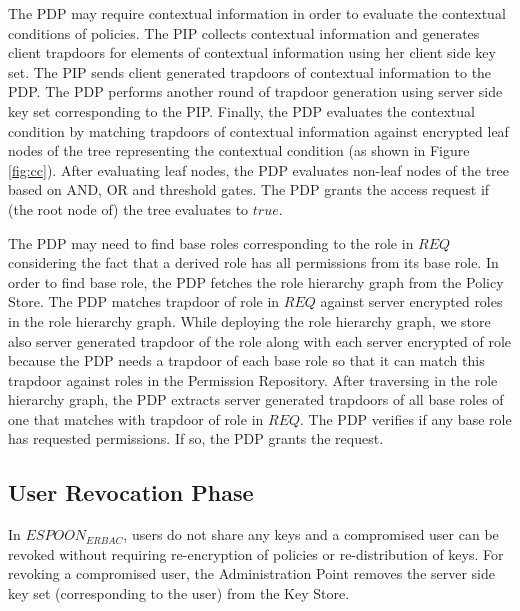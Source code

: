\documentclass[final,5p,times,twocolumn]{elsarticle}
\begin{document}
The PDP may require contextual information in order to evaluate the contextual conditions of policies. The PIP collects contextual information and generates client trapdoors for elements of contextual information using her client side key set. The PIP sends client generated trapdoors of contextual information to the PDP. The PDP performs another round of trapdoor generation using server side key set corresponding to the PIP. Finally, the PDP evaluates the contextual condition by matching trapdoors of contextual information against encrypted leaf nodes of the tree representing the contextual condition (as shown in Figure \ref{fig:cc}). After evaluating leaf nodes, the PDP evaluates non-leaf nodes of the tree based on AND, OR and threshold gates. The PDP grants the access request if (the root node of) the tree evaluates to $\mathit{true}$.

The PDP may need to find base roles corresponding to the role in $\mathit{REQ}$ considering the fact that a derived role has all permissions from its base role. In order to find base role, the PDP fetches the role hierarchy graph from the Policy Store. The PDP matches trapdoor of role in $\mathit{REQ}$ against server encrypted roles in the role hierarchy graph. While deploying the role hierarchy graph, we store also server generated trapdoor of the role along with each server encrypted of role because the PDP needs a trapdoor of each base role so that it can match this trapdoor against roles in the Permission Repository. After traversing in the role hierarchy graph, the PDP extracts server generated trapdoors of all base roles of one that matches with trapdoor of role in $\mathit{REQ}$. The PDP verifies if any base role has requested permissions. If so, the PDP grants the request.


\subsection{User Revocation Phase}

In $\mathit{ESPOON_{ERBAC}}$, users do not share any keys and a compromised user can be revoked without requiring re-encryption of policies or re-distribution of keys. For revoking a compromised user, the Administration Point removes the server side key set (corresponding to the user) from the Key Store.
\end{document}
